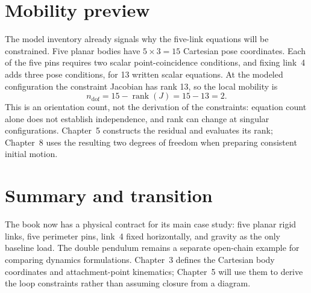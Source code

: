 \documentclass[../main.tex]{subfiles}
\begin{document}
\section{Mobility preview}

The model inventory already signals why the five-link equations will be constrained. Five planar bodies have $5\times3=15$ Cartesian pose coordinates. Each of the five pins requires two scalar point-coincidence conditions, and fixing link~4 adds three pose conditions, for 13 written scalar equations. At the modeled configuration the constraint Jacobian has rank 13, so the local mobility is
\begin{equation}
n_{\mathrm{dof}}=15-\operatorname{rank}(J)=15-13=2.
\label{eq:five-link-mobility}
\end{equation}
This is an orientation count, not the derivation of the constraints: equation count alone does not establish independence, and rank can change at singular configurations. Chapter~5 constructs the residual and evaluates its rank; Chapter~8 uses the resulting two degrees of freedom when preparing consistent initial motion.

\section{Summary and transition}

The book now has a physical contract for its main case study: five planar rigid links, five perimeter pins, link~4 fixed horizontally, and gravity as the only baseline load. The double pendulum remains a separate open-chain example for comparing dynamics formulations. Chapter~3 defines the Cartesian body coordinates and attachment-point kinematics; Chapter~5 will use them to derive the loop constraints rather than assuming closure from a diagram.

\ifSubfilesClassLoaded{\backmatter\bookbibliography}{}
\end{document}

